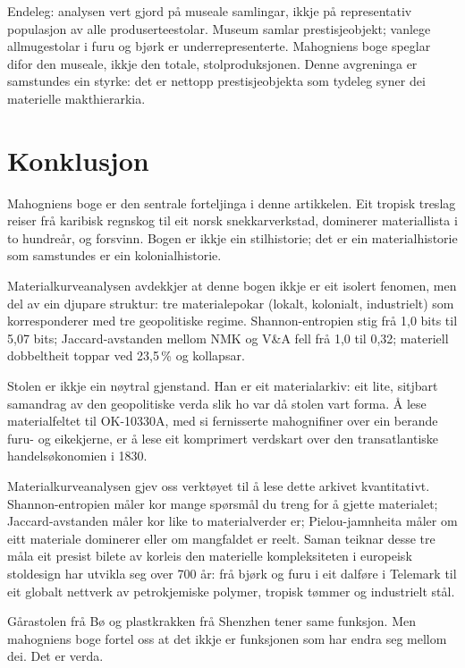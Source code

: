 \documentclass[10pt, a4paper, twocolumn]{article}
\begin{document}
Endeleg: analysen vert gjord på museale samlingar, ikkje på representativ populasjon av alle produserteestolar. Museum samlar prestisjeobjekt; vanlege allmugestolar i furu og bjørk er underrepresenterte. Mahogniens boge speglar difor den museale, ikkje den totale, stolproduksjonen. Denne avgreninga er samstundes ein styrke: det er nettopp prestisjeobjekta som tydeleg syner dei materielle makthierarkia.


\section{Konklusjon}

Mahogniens boge er den sentrale forteljinga i denne artikkelen. Eit tropisk treslag reiser frå karibisk regnskog til eit norsk snekkarverkstad, dominerer materiallista i to hundreår, og forsvinn. Bogen er ikkje ein stilhistorie; det er ein materialhistorie som samstundes er ein kolonialhistorie.

Materialkurveanalysen avdekkjer at denne bogen ikkje er eit isolert fenomen, men del av ein djupare struktur: tre materialepokar (lokalt, kolonialt, industrielt) som korresponderer med tre geopolitiske regime. Shannon-entropien stig frå 1,0 bits til 5,07 bits; Jaccard-avstanden mellom NMK og V\&A fell frå 1,0 til 0,32; materiell dobbeltheit toppar ved 23,5\,\% og kollapsar.

Stolen er ikkje ein nøytral gjenstand. Han er eit materialarkiv: eit lite, sitjbart samandrag av den geopolitiske verda slik ho var då stolen vart forma. Å lese materialfeltet til OK-10330A, med si fernisserte mahognifiner over ein berande furu- og eikekjerne, er å lese eit komprimert verdskart over den transatlantiske handelsøkonomien i 1830.

Materialkurveanalysen gjev oss verktøyet til å lese dette arkivet kvantitativt. Shannon-entropien måler kor mange spørsmål du treng for å gjette materialet; Jaccard-avstanden måler kor like to materialverder er; Pielou-jamnheita måler om eitt materiale dominerer eller om mangfaldet er reelt. Saman teiknar desse tre måla eit presist bilete av korleis den materielle kompleksiteten i europeisk stoldesign har utvikla seg over 700 år: frå bjørk og furu i eit dalføre i Telemark til eit globalt nettverk av petrokjemiske polymer, tropisk tømmer og industrielt stål.

Gårastolen frå Bø og plastkrakken frå Shenzhen tener same funksjon. Men mahogniens boge fortel oss at det ikkje er funksjonen som har endra seg mellom dei. Det er verda.


\newpage
\onecolumn


\end{document}
